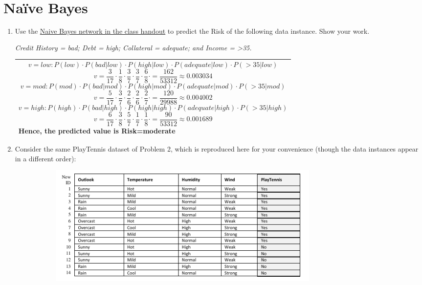 \documentclass[10pt]{article}
\newenvironment{answer}
    {\begin{center}
    \begin{tabular}{|p{0.9\textwidth}|}
    \hline
    }
    { 
    \\\hline
    \end{tabular} 
    \end{center}
    }
\begin{document}
  \section*{Naïve Bayes}
  \begin{enumerate}[resume]
  \item Use the \href{https://canvas.wpi.edu/files/1063366/download?download_frd=1}{Naive Bayes network in the class handout} to predict the Risk of the following data
    instance. Show your work.
    \begin{center}
      \textit{Credit History = bad; Debt = high; Collateral = adequate; and Income = >35.}
    \end{center}
    \begin{answer}
      \[ v = low: P(low)\cdot P(bad|low)\cdot P(high|low)\cdot P(adequate|low)\cdot P(>35|low) \]
      \[ v = \frac{3}{17}\cdot \frac{1}{8}\cdot \frac{3}{7}\cdot \frac{3}{7}\cdot \frac{6}{8}\cdot = \frac{162}{53312} \approx 0.003034 \]
      \[ v = mod: P(mod)\cdot P(bad|mod)\cdot P(high|mod)\cdot P(adequate|mod)\cdot P(>35|mod) \]
      \[ v = \frac{5}{17}\cdot \frac{3}{7}\cdot \frac{2}{6}\cdot \frac{2}{6}\cdot \frac{2}{7}\cdot = \frac{120}{29988} \approx 0.004002 \]
      \[ v = high: P(high)\cdot P(bad|high)\cdot P(high|high)\cdot P(adequate|high)\cdot P(>35|high) \]
      \[ v = \frac{6}{17}\cdot \frac{3}{8}\cdot \frac{5}{7}\cdot \frac{1}{7}\cdot \frac{1}{8}\cdot = \frac{90}{53312} \approx 0.001689\]
   Hence, the predicted value is Risk=moderate
    \end{answer}  
  \item Consider the same PlayTennis dataset of Problem 2, which is reproduced here for your
    convenience (though the data instances appear in a different order):
    \begin{figure}[h!]
      \centering
      \includegraphics[width=0.8\textwidth,height=6cm]{hw3_5.png}
    \end{figure}
    \begin{enumerate}

\end{enumerate}
\end{enumerate}
\end{document}
